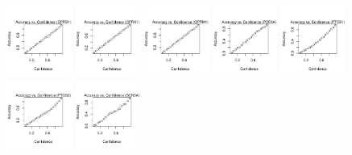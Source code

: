 \documentclass[utf8]{frontiersSCNS} %
\begin{document}
\begin{figure}[h!]
\includegraphics[width=0.19\textwidth]{figures/calibration_plots/oprd1_calib.pdf}
\includegraphics[width=0.19\textwidth]{figures/calibration_plots/oprk1_calib.pdf}
\includegraphics[width=0.19\textwidth]{figures/calibration_plots/oprm1_calib.pdf}
\includegraphics[width=0.19\textwidth]{figures/calibration_plots/pde3a_calib.pdf}
\includegraphics[width=0.19\textwidth]{figures/calibration_plots/ptgs1_calib.pdf}
\includegraphics[width=0.19\textwidth]{figures/calibration_plots/ptgs2_calib.pdf}
\includegraphics[width=0.19\textwidth]{figures/calibration_plots/scn5a_calib.pdf}

\end{figure}
\end{document}
